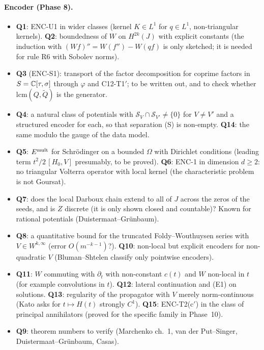 \paragraph{Encoder (Phase 8).}
\begin{itemize}
\item \textbf{Q1}: ENC-U1 in wider classes (kernel $K\in L^1$ for $q\in L^1$, non-triangular kernels). \textbf{Q2}: boundedness of $W$ on $H^{2k}(J)$ with explicit constants (the induction with $(Wf)''=W(f'')-W(qf)$ is only sketched; it is needed for rule R6 with Sobolev norms).
\item \textbf{Q3} (ENC-S1): transport of the factor decomposition for coprime factors in $S=\mathbb{C}[\tau,\sigma]$ through $\varphi$ and C12-T1$'$; to be written out, and to check whether $\mathrm{lcm}(Q,\tilde Q)$ is the generator.
\item \textbf{Q4}: a natural class of potentials with $\mathcal S_V\cap\mathcal S_{V'}\ne\{0\}$ for $V\ne V'$ and a structured encoder for each, so that separation (S) is non-empty. \textbf{Q14}: the same modulo the gauge of the data model.
\item \textbf{Q5}: $E^{\rm mult}$ for Schr\"odinger on a bounded $\Omega$ with Dirichlet conditions (leading term $t^2/2\,[H_0,V]$ presumably, to be proved). \textbf{Q6}: ENC-1 in dimension $d\ge2$: no triangular Volterra operator with local kernel (the characteristic problem is not Goursat).
\item \textbf{Q7}: does the local Darboux chain extend to all of $J$ across the zeros of the seeds, and is $Z$ discrete (it is only shown closed and countable)? Known for rational potentials (Duistermaat--Gr\"unbaum).
\item \textbf{Q8}: a quantitative bound for the truncated Foldy--Wouthuysen series with $V\in W^{k,\infty}$ (error $O(m^{-k-1})$?). \textbf{Q10}: non-local but explicit encoders for non-quadratic $V$ (Bluman--Shtelen classify only pointwise encoders).
\item \textbf{Q11}: $W$ commuting with $\partial_t$ with non-constant $c(t)$ and $W$ non-local in $t$ (for example convolutions in $t$). \textbf{Q12}: lateral continuation and (E1) on solutions. \textbf{Q13}: regularity of the propagator with $V$ merely norm-continuous (Kato asks for $t\mapsto H(t)$ strongly $C^1$). \textbf{Q15}: ENC-T2(c$'$) in the class of principal annihilators (proved for the specific family in Phase~10).
\item \textbf{Q9}: theorem numbers to verify (Marchenko ch.~1, van der Put--Singer, Duistermaat--Gr\"unbaum, Casas).
\end{itemize}

